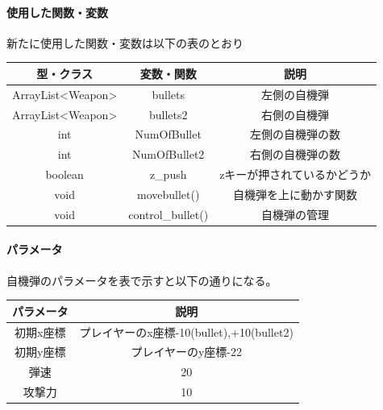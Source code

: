 \documentclass[a4paper,titlepage,11pt]{ltjsarticle}
\begin{document}
\paragraph{使用した関数・変数}
新たに使用した関数・変数は以下の表のとおり
\begin{table}[H]
	\begin{center}
		\begin{tabular}{|c|c|c|}
			\hline 
		 型・クラス & 変数・関数 & 説明\\ \hline \hline
		 ArrayList<Weapon> & bullets & 左側の自機弾 \\ \hline
		 ArrayList<Weapon> & bullets2 & 右側の自機弾 \\ \hline
		 int & NumOfBullet & 左側の自機弾の数 \\ \hline
		 int & NumOfBullet2 & 右側の自機弾の数 \\ \hline
		 boolean & z\_push & zキーが押されているかどうか \\ \hline
		 void & movebullet() & 自機弾を上に動かす関数 \\ \hline
		 void & control\_bullet() & 自機弾の管理 \\ \hline 
		\end{tabular}
	\end{center}
\end{table}

\paragraph{パラメータ}
自機弾のパラメータを表で示すと以下の通りになる。
\begin{table}[H]
\centering
\begin{tabular}{|c|c|}
	\hline
	パラメータ & 説明 \\\hline \hline
	初期x座標 & プレイヤーのx座標-10(bullet),+10(bullet2) \\ \hline
	初期y座標 & プレイヤーのy座標-22 \\ \hline
	弾速 & 20 \\ \hline 
	攻撃力 & 10 \\ \hline
\end{tabular}
\end{table}
\end{document}
